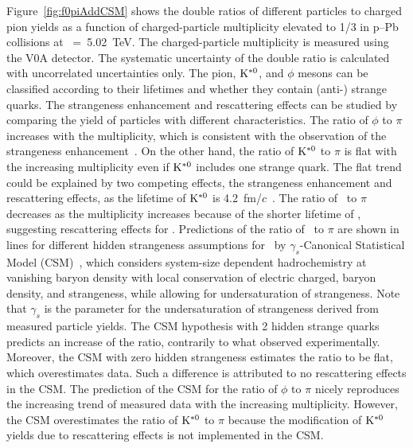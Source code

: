 Figure~\ref{fig:f0piAddCSM} shows the double ratios of different particles to charged pion yields as a function of charged-particle multiplicity elevated to 1/3 in p--Pb collisions at \snn~=~5.02~TeV. The charged-particle multiplicity is measured using the V0A detector. The systematic uncertainty of the double ratio is calculated with uncorrelated uncertainties only. The pion, $\rm{}K^{*0}$, and $\phi$ mesons can be classified according to their lifetimes and whether they contain (anti-) strange quarks. The strangeness enhancement and rescattering effects can be studied by comparing the yield of particles with different characteristics. The ratio of $\phi$ to $\pi$ increases with the multiplicity, which is consistent with the observation of the strangeness enhancement~\cite{ALICE:2016fzo}. On the other hand, the ratio of $\rm{}K^{*0}$ to $\pi$ is flat with the increasing multiplicity even if $\rm{}K^{*0}$ includes one strange quark. The flat trend could be explained by two competing effects, the strangeness enhancement and rescattering effects, as the lifetime of $\rm{}K^{*0}$ is 4.2~fm/$c$~\cite{ParticleDataGroup:2020ssz}. The ratio of \fzero~to $\pi$ decreases as the multiplicity increases because of the shorter lifetime of \fzero, suggesting rescattering effects for \fzero. Predictions of the ratio of \fzero~to $\pi$ are shown in lines for different hidden strangeness assumptions for \fzero~by $\gamma_{s}$-Canonical Statistical Model (CSM)~\cite{Vovchenko:2019kes}, which considers system-size dependent hadrochemistry at vanishing baryon density with local conservation of electric charged, baryon density, and strangeness, while allowing for undersaturation of strangeness. Note that $\gamma_{s}$ is the parameter for the undersaturation of strangeness derived from measured particle yields. The CSM hypothesis with 2 hidden strange quarks predicts an increase of the ratio, contrarily to what observed experimentally. Moreover, the CSM with zero hidden strangeness estimates the ratio to be flat, which overestimates data. Such a difference is attributed to no rescattering effects in the CSM. The prediction of the CSM for the ratio of $\phi$ to $\pi$ nicely reproduces the increasing trend of measured data with the increasing multiplicity. However, the CSM overestimates the ratio of $\rm{}K^{*0}$ to $\pi$ because the modification of $\rm{}K^{*0}$ yields due to rescattering effects is not implemented in the CSM.

